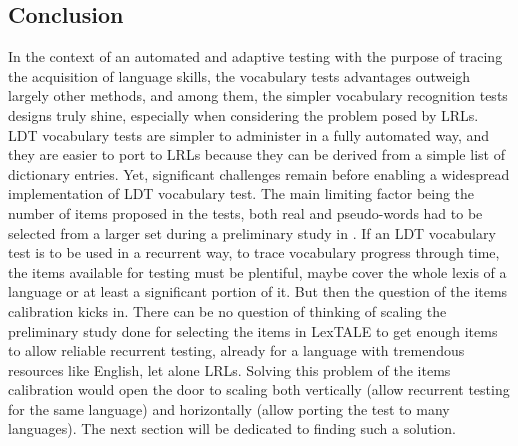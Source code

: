 
    \subsection{Conclusion}
In the context of an automated and adaptive testing with the purpose of tracing the acquisition of language skills, the vocabulary tests advantages outweigh largely other methods, and among them, the simpler vocabulary recognition tests designs truly shine, especially when considering the problem posed by LRLs. LDT vocabulary tests are simpler to administer in a fully automated way, and they are easier to port to LRLs because they can be derived from a simple list of dictionary entries. Yet, significant challenges remain before enabling a widespread implementation of LDT vocabulary test. The main limiting factor being the number of items proposed in the tests, both real and pseudo-words had to be selected from a larger set during a preliminary study in \cite{lemhofer_introducing_2012}. If an LDT vocabulary test is to be used in a recurrent way, to trace vocabulary progress through time, the items available for testing must be plentiful, maybe cover the whole lexis of a language or at least a significant portion of it. But then the question of the items calibration kicks in. There can be no question of thinking of scaling the preliminary study done for selecting the items in LexTALE to get enough items to allow reliable recurrent testing, already for a language with tremendous resources like English, let alone LRLs. Solving this problem of the items calibration would open the door to scaling both vertically (allow recurrent testing for the same language) and horizontally (allow porting the test to many languages). The next section will be dedicated to finding such a solution.

